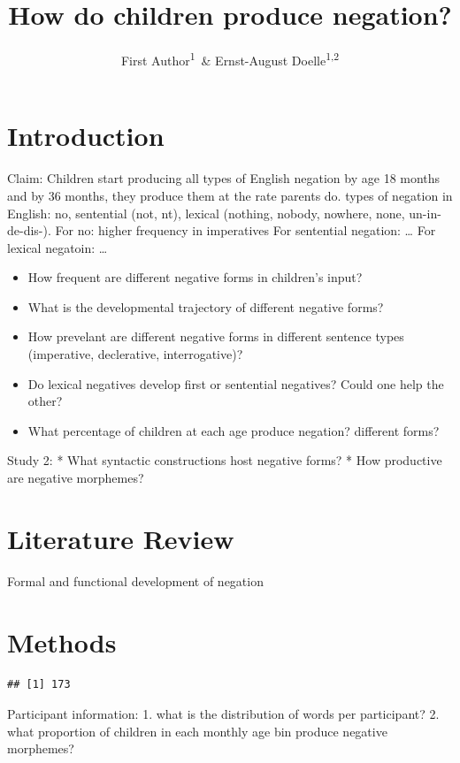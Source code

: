 \documentclass[man]{apa6}
\title{How do children produce negation?}
\author{First Author\textsuperscript{1}~\& Ernst-August
Doelle\textsuperscript{1,2}}
\date{}
\affiliation{
\vspace{0.5cm}
\textsuperscript{1} Wilhelm-Wundt-University\\\textsuperscript{2} Konstanz Business School}
\begin{document}
\maketitle

\section{Introduction}\label{introduction}

Claim: Children start producing all types of English negation by age 18
months and by 36 months, they produce them at the rate parents do. types
of negation in English: no, sentential (not, nt), lexical (nothing,
nobody, nowhere, none, un-in-de-dis-). For no: higher frequency in
imperatives For sentential negation: \ldots{} For lexical negatoin:
\ldots{}

\begin{itemize}
\item
  How frequent are different negative forms in children's input?
\item
  What is the developmental trajectory of different negative forms?
\item
  How prevelant are different negative forms in different sentence types
  (imperative, declerative, interrogative)?
\item
  Do lexical negatives develop first or sentential negatives? Could one
  help the other?
\item
  What percentage of children at each age produce negation? different
  forms?
\end{itemize}

Study 2: * What syntactic constructions host negative forms? * How
productive are negative morphemes?

\section{Literature Review}\label{literature-review}

Formal and functional development of negation

\section{Methods}\label{methods}

\begin{verbatim}
## [1] 173
\end{verbatim}

Participant information: 1. what is the distribution of words per
participant? 2. what proportion of children in each monthly age bin
produce negative morphemes?
\end{document}
